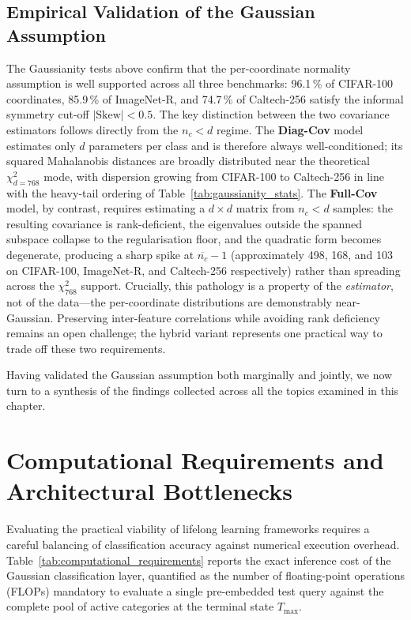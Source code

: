 \subsection{Empirical Validation of the Gaussian Assumption}
\label{sec:an:gauss}

The Gaussianity tests above confirm that the per-coordinate normality assumption is well supported across all three benchmarks: 96.1\,\% of CIFAR-100 coordinates, 85.9\,\% of ImageNet-R, and 74.7\,\% of Caltech-256 satisfy the informal symmetry cut-off $|\text{Skew}|<0.5$. The key distinction between the two covariance estimators follows directly from the $n_c < d$ regime. The \textbf{Diag-Cov} model estimates only $d$ parameters per class and is therefore always well-conditioned; its squared Mahalanobis distances are broadly distributed near the theoretical $\chi^2_{d=768}$ mode, with dispersion growing from CIFAR-100 to Caltech-256 in line with the heavy-tail ordering of Table~\ref{tab:gaussianity_stats}. The \textbf{Full-Cov} model, by contrast, requires estimating a $d\times d$ matrix from $n_c < d$ samples: the resulting covariance is rank-deficient, the eigenvalues outside the spanned subspace collapse to the regularisation floor, and the quadratic form becomes degenerate, producing a sharp spike at $\overline{n_c}-1$ (approximately 498, 168, and 103 on CIFAR-100, ImageNet-R, and Caltech-256 respectively) rather than spreading across the $\chi^2_{768}$ support. Crucially, this pathology is a property of the \emph{estimator}, not of the data---the per-coordinate distributions are demonstrably near-Gaussian. Preserving inter-feature correlations while avoiding rank deficiency remains an open challenge; the hybrid variant represents one practical way to trade off these two requirements.

Having validated the Gaussian assumption both marginally and jointly, we now turn to a synthesis of the findings collected across all the topics examined in this chapter.

\section{Computational Requirements and Architectural Bottlenecks}
\label{sec:computational_requirements}
\label{sec:an:other}

Evaluating the practical viability of lifelong learning frameworks requires a careful balancing of classification accuracy against numerical execution overhead. Table~\ref{tab:computational_requirements} reports the exact inference cost of the Gaussian classification layer, quantified as the number of floating-point operations (FLOPs) mandatory to evaluate a single pre-embedded test query against the complete pool of active categories at the terminal state $T_{\max}$. 


